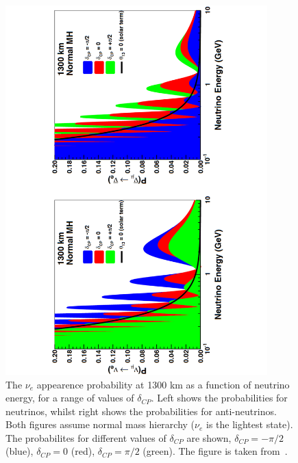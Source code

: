 \begin{figure}
  \centering 
  \includegraphics[width=0.9\textwidth]{DUNEOscillProb}
  \caption[The $\nu_e$ appearence probability at 1300 km as a function of neutrino energy, for a range of values of $\delta_{CP}$]
          {The $\nu_e$ appearence probability at 1300 km as a function of neutrino energy, for a range of values of $\delta_{CP}$. Left shows the probabilities for neutrinos, whilst right shows the probabilities for anti-neutrinos. Both figures assume normal mass hierarchy ($\nu_e$ is the lightest state). The probabilites for different values of $\delta_{CP}$ are shown, $\delta_{CP} = -\pi/2$ (blue), $\delta_{CP} = 0$ (red), $\delta_{CP} = \pi/2$ (green). The figure is taken from~\citep{DUNECDR_V2}.}
  \label{fig:DUNEOscillProb}
\end{figure}

